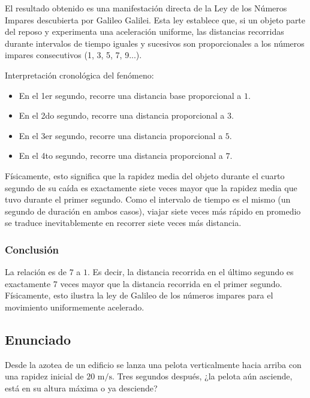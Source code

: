 \documentclass[12pt, a4paper]{article}
\begin{document}
El resultado obtenido es una manifestación directa de la Ley de los Números Impares descubierta por Galileo Galilei. Esta ley establece que, si un objeto parte del reposo y experimenta una aceleración uniforme, las distancias recorridas durante intervalos de tiempo iguales y sucesivos son proporcionales a los números impares consecutivos (1, 3, 5, 7, 9...).

Interpretación cronológica del fenómeno:
\begin{itemize}
    \item En el 1er segundo, recorre una distancia base proporcional a $1$.
    \item En el 2do segundo, recorre una distancia proporcional a $3$.
    \item En el 3er segundo, recorre una distancia proporcional a $5$.
    \item En el 4to segundo, recorre una distancia proporcional a $7$.
\end{itemize}

Físicamente, esto significa que la rapidez media del objeto durante el cuarto segundo de su caída es exactamente siete veces mayor que la rapidez media que tuvo durante el primer segundo. Como el intervalo de tiempo es el mismo (un segundo de duración en ambos casos), viajar siete veces más rápido en promedio se traduce inevitablemente en recorrer siete veces más distancia.

\subsubsection*{Conclusión}

La relación es de $7$ a $1$. Es decir, la distancia recorrida en el último segundo es exactamente 7 veces mayor que la distancia recorrida en el primer segundo. Físicamente, esto ilustra la ley de Galileo de los números impares para el movimiento uniformemente acelerado.

\newpage

\subsection*{Enunciado}

Desde la azotea de un edificio se lanza una pelota verticalmente hacia arriba con una rapidez inicial de $20 \text{ m/s}$. Tres segundos después, ¿la pelota aún asciende, está en su altura máxima o ya desciende?

\vspace{0.5cm}
\end{document}
